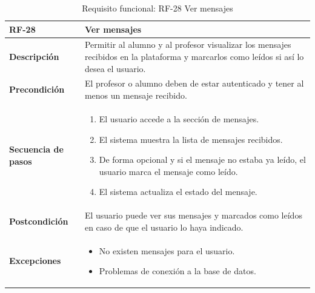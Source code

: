 \begin{table}[H]
\centering
\begin{tabularx}{\textwidth}{
  |>{\centering\arraybackslash}l
  |>{\centering\arraybackslash}X|}
\hline
\textbf{RF-28} & \textbf{Ver mensajes} \\ \hline

\textbf{Descripción} & Permitir al alumno y al profesor visualizar los mensajes recibidos en la plataforma y marcarlos como leídos si así lo desea el usuario. \\ \hline

\textbf{Precondición} & El profesor o alumno deben de estar autenticado y tener al menos un mensaje recibido. \\ \hline

\textbf{Secuencia de pasos} &
\begin{enumerate}
  \item El usuario accede a la sección de mensajes.
  \item El sistema muestra la lista de mensajes recibidos.
  \item De forma opcional y si el mensaje no estaba ya leído, el usuario marca el mensaje como leído.
  \item El sistema actualiza el estado del mensaje.
\end{enumerate} \\ \hline

\textbf{Postcondición} & El usuario puede ver sus mensajes y marcados como leídos en caso de que el usuario lo haya indicado. \\ \hline

\textbf{Excepciones} &
\begin{itemize}
  \item No existen mensajes para el usuario.
  \item Problemas de conexión a la base de datos.
\end{itemize} \\ \hline
\end{tabularx}
\caption{Requisito funcional: RF-28 Ver mensajes}
\label{tab:RF-28}
\end{table}
